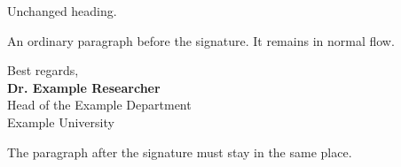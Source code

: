 \documentclass[11pt]{article}
\newcommand{\PersonName}{Dr. Example Researcher}
\begin{document}
Unchanged heading.

An ordinary paragraph before the signature. It remains in normal flow.

\noindent\begin{minipage}{\linewidth}
Best regards,\\[10mm]
\textbf{\PersonName}\\[2pt]
Head of the Example Department\\[2pt]
Example University
\end{minipage}

The paragraph after the signature must stay in the same place.
\end{document}
